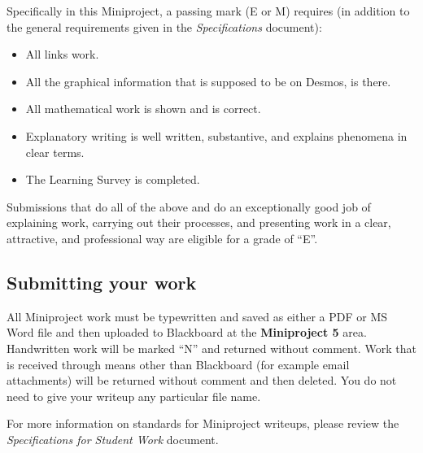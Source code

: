 \documentclass[11pt,letterpaper]{article}
\begin{document}
Specifically in this Miniproject, a passing mark (E or M) requires (in addition to the general requirements given in the \textit{Specifications} document): 
\begin{itemize}
	\item All links work. 
	\item All the graphical information that is supposed to be on Desmos, is there. 
	\item All mathematical work is shown and is correct. 
	\item Explanatory writing is well written, substantive, and explains phenomena in clear terms. 
	\item The Learning Survey is completed. 
\end{itemize}
Submissions that do all of the above and do an exceptionally good job of explaining work, carrying out their processes, and presenting work in a clear, attractive, and professional way are eligible for a grade of ``E''. 


\subsection*{Submitting your work}

All Miniproject work must be typewritten and saved as either a PDF or MS Word file and then uploaded to Blackboard at the \textbf{Miniproject 5} area. Handwritten work will be marked ``N'' and returned without comment. Work that is received through means other than Blackboard (for example email attachments) will be returned without comment and then deleted. You do not need to give your writeup any particular file name. 

For more information on standards for Miniproject writeups, please review the \textit{Specifications for Student Work} document. 
\end{document}
